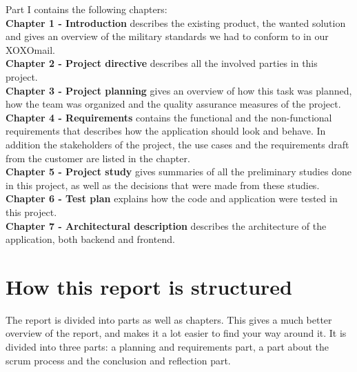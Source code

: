 Part I contains the following chapters:\\
\textbf{Chapter 1 - Introduction} describes the existing product, the wanted solution and gives an \hspace*{4.3em} overview of the military standards we had to conform to in our XOXOmail.\\
\textbf{Chapter 2 - Project directive} describes all the involved parties in this project.\\
\textbf{Chapter 3 - Project planning} gives an overview of how this task was planned, how the team \hspace*{4.3em} was organized and the quality assurance measures of the project. \\
\textbf{Chapter 4 - Requirements} contains the functional and the non-functional requirements that  \hspace*{4.3em} describes how the application should look and behave. In addition the stakeholders of \hspace*{4.3em} the project, the use cases and the requirements draft from the customer are listed in \hspace*{4.3em} the chapter. \\
\textbf{Chapter 5 - Project study} gives summaries of all the preliminary studies done in this project, \hspace*{4.3em} as well as the decisions that were made from these studies.\\
\textbf{Chapter 6 - Test plan} explains how the code and application were tested in this project.\\
\textbf{Chapter 7 - Architectural description} describes the architecture of the application, both \hspace*{4.3em} backend and frontend.\\

\section*{How this report is structured}
The report is divided into parts as well as chapters. This gives a much better overview of the report, and makes it a lot easier to find your way around it. It is divided into three parts: a planning and requirements part, a part about the scrum process and the conclusion and reflection part.